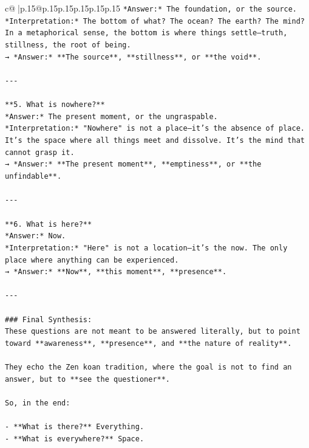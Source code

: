 \documentclass{article}
\begin{document}
{\begin{supertabular}{c@{$\;$}|p{.15\linewidth}@{}p{.15\linewidth}p{.15\linewidth}p{.15\linewidth}p{.15\linewidth}p{.15\linewidth}}
{{{\texttt{*Answer:* The foundation, or the source.  } \\
\texttt{*Interpretation:* The bottom of what? The ocean? The earth? The mind? In a metaphorical sense, the bottom is where things settle—truth, stillness, the root of being.  } \\
\texttt{→ *Answer:* **The source**, **stillness**, or **the void**.} \\
\\ 
\texttt{{-}{-}{-}} \\
\\ 
\texttt{**5. What is nowhere?**  } \\
\texttt{*Answer:* The present moment, or the ungraspable.  } \\
\texttt{*Interpretation:* "Nowhere" is not a place—it's the absence of place. It’s the space where all things meet and dissolve. It’s the mind that cannot grasp it.  } \\
\texttt{→ *Answer:* **The present moment**, **emptiness**, or **the unfindable**.} \\
\\ 
\texttt{{-}{-}{-}} \\
\\ 
\texttt{**6. What is here?**  } \\
\texttt{*Answer:* Now.  } \\
\texttt{*Interpretation:* "Here" is not a location—it’s the now. The only place where anything can be experienced.  } \\
\texttt{→ *Answer:* **Now**, **this moment**, **presence**.} \\
\\ 
\texttt{{-}{-}{-}} \\
\\ 
\texttt{\#\#\# Final Synthesis:} \\
\texttt{These questions are not meant to be answered literally, but to point toward **awareness**, **presence**, and **the nature of reality**.} \\
\\ 
\texttt{They echo the Zen koan tradition, where the goal is not to find an answer, but to **see the questioner**.} \\
\\ 
\texttt{So, in the end:} \\
\\ 
\texttt{{-} **What is there?** Everything.  } \\
\texttt{{-} **What is everywhere?** Space.  } \\
}}}
\end{supertabular}}
\end{document}
